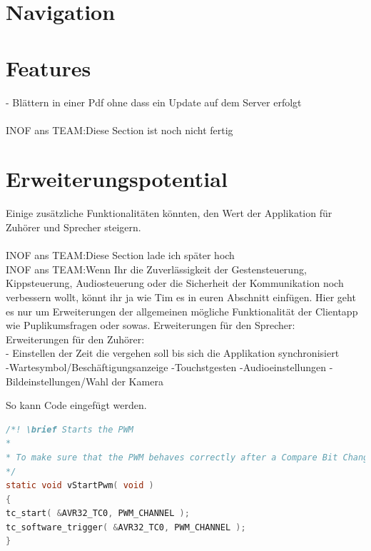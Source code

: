 \newpage

\section{Navigation}



\section{Features}
- Blättern in einer Pdf ohne dass ein Update auf dem Server erfolgt\\
\\INOF ans TEAM:Diese Section ist noch nicht fertig
\section{Erweiterungspotential}
Einige zusätzliche Funktionalitäten könnten, den Wert der Applikation für Zuhörer und Sprecher steigern.\\
\\INOF ans TEAM:Diese Section lade ich später hoch
\\INOF ans TEAM:Wenn Ihr die Zuverlässigkeit der Gestensteuerung, Kippsteuerung, Audiosteuerung oder die Sicherheit der Kommunikation noch verbessern wollt, könnt ihr ja wie Tim es in euren Abschnitt einfügen. Hier geht es nur um Erweiterungen der allgemeinen mögliche Funktionalität der Clientapp wie Puplikumsfragen oder sowas.
Erweiterungen für den Sprecher:\\

Erweiterungen für den Zuhörer:\\
- Einstellen der Zeit die vergehen soll bis sich die Applikation synchronisiert\\

-Wartesymbol/Beschäftigungsanzeige
-Touchstgesten
-Audioeinstellungen
-Bildeinstellungen/Wahl der Kamera




\newpage
So kann Code eingefügt werden.
\begin{lstlisting}[frame=single,breaklines=true,basicstyle=\tiny,language=C,label={PWMStart},caption={Kommentierter Start der PWM}]
/*! \brief Starts the PWM
* 
* To make sure that the PWM behaves correctly after a Compare Bit Change the PWM is started and reset with a software trigger.
*/
static void vStartPwm( void )
{
tc_start( &AVR32_TC0, PWM_CHANNEL );
tc_software_trigger( &AVR32_TC0, PWM_CHANNEL );
}
\end{lstlisting}